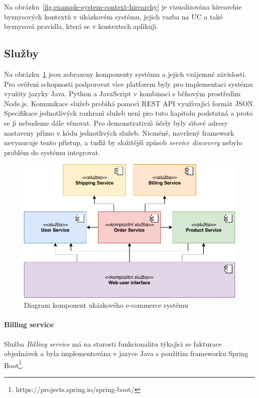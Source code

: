 Na obrázku~\ref{fig:example-system-context-hirearchy} je vizualizována
hirearchie byznysov\'ych kontextů v ukázkovém systému, jejich vazba na \gls{UC}
a také byznysová pravidla, která se v kontextech aplikuj\'{\i}.

\subsection{Služby}

Na obrázku~\ref{fig:example-system} jsou zobrazeny komponenty systému a jejich vzájemné závislosti.
Pro ověřen\'{\i} schopnosti podporovat v\'{\i}ce platforem byly pro implementaci systému využity
jazyky Java, Python a JavaScript v kombinaci s běhov\'ym prostřed\'{\i}m Node.js.
Komunikace služeb prob\'{\i}há pomoc\'{\i} \gls{REST} \gls{API} využ\'{\i}vaj\'{\i}c\'{\i} formát \gls{JSON}.
Specifikace jednotliv\'ych rozhran\'{\i} služeb nen\'{\i} pro tuto kapitolu podstatná a proto se
j\'{\i} nebudeme dále věnovat. Pro demonstrativn\'{\i} účely byly s\'{\i}ťové adresy nastaveny př\'{\i}mo v kódu jednotliv\'ych
služeb. Nicméně, navržen\'y framework nevynucuje tento př\'{\i}stup, a tud\'{\i}ž by složitějš\'{\i}
způsob \textit{service discovery} nebylo problém do systému integrovat.

\begin{figure}
    \centering
    \includegraphics[keepaspectratio=true, width=0.8\linewidth]{figures/example-system.pdf}
    \caption{Diagram komponent ukázkového e-commerce systému}
    \label{fig:example-system}
\end{figure}

\paragraph{Billing service}

Služba \textit{Billing service} má na starosti funkcionalitu t\'ykaj\'{\i}c\'{\i} se fakturace objednávek
a byla implementována v jazyce Java s použit\'{\i}m frameworku Spring Boot\footnote{https://projects.spring.io/spring-boot/}.

